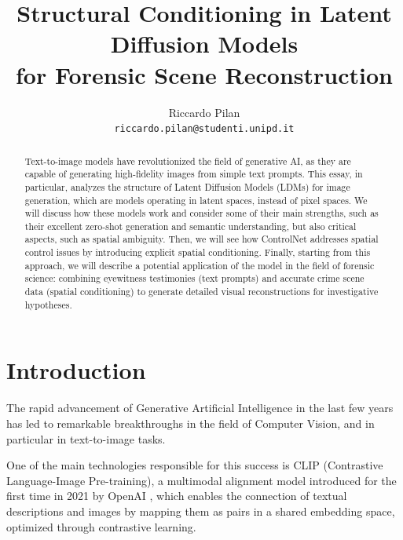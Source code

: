 \documentclass[10pt,twocolumn,letterpaper]{article}
\begin{document}
\title{Structural Conditioning in Latent Diffusion Models \\for Forensic Scene Reconstruction}

\author{Riccardo Pilan\\
{\tt\small riccardo.pilan@studenti.unipd.it}
}

\maketitle

\begin{abstract}
	
	Text-to-image models have revolutionized the field of generative AI, as they are capable of generating high-fidelity images from simple text prompts. 
    This essay, in particular, analyzes the structure of Latent Diffusion Models (LDMs) for image generation, which are models operating in latent spaces, instead of pixel spaces.
    We will discuss how these models work and consider some of their main strengths, such as their excellent zero-shot generation and semantic understanding, but also critical aspects, such as spatial ambiguity. 
    Then, we will see how ControlNet addresses spatial control issues by introducing explicit spatial conditioning.
    Finally, starting from this approach, we will describe a potential application of the model in the field of forensic science: combining eyewitness testimonies (text prompts) and accurate crime scene data (spatial conditioning) to generate detailed visual reconstructions for investigative hypotheses.
\end{abstract}

\section{Introduction}

The rapid advancement of Generative Artificial Intelligence in the last few years has led to remarkable breakthroughs in the field of Computer Vision, and in particular in text-to-image tasks.

One of the main technologies responsible for this success is CLIP (Contrastive Language-Image Pre-training), a multimodal alignment model introduced for the first time in 2021 by OpenAI \cite{pmlr-v139-radford21a}, which enables the connection of textual descriptions and images by mapping them as pairs in a shared embedding space, optimized through contrastive learning.
\end{document}
